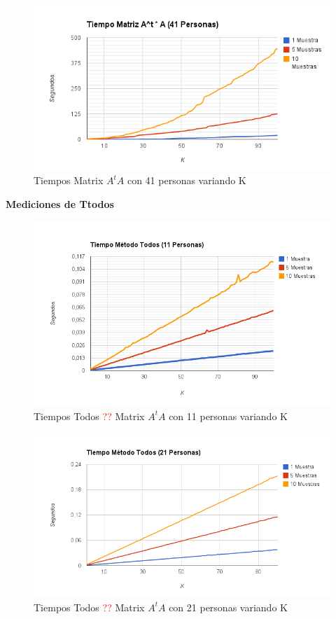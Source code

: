 \begin{figure}[H]
\includegraphics[width=1\textwidth]{img/imagec.png}
     \caption{Tiempos Matrix $A^tA$ con 41 personas variando K}
     \label{fig:figura1}
\end{figure}


\textbf{Mediciones de Ttodos }

\begin{figure}[H]
\includegraphics[width=1\textwidth]{img/imaged.png}
     \caption{Tiempos Todos \textcolor{red}{??} Matrix $A^tA$ con 11 personas variando K}
     \label{fig:figura1}
\end{figure}

\begin{figure}[H]
\includegraphics[width=1\textwidth]{img/imagee.png}
     \caption{Tiempos Todos \textcolor{red}{??} Matrix $A^tA$ con 21 personas variando K}
     \label{fig:figura1}
\end{figure}

